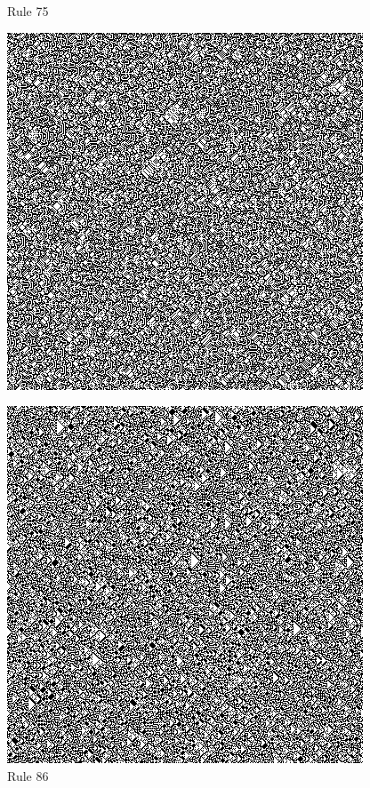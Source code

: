 \documentclass{article}
\begin{document}
\begin{figure}[H]
  \begin{center}
    \begin{minipage}{0.48\textwidth}
      \caption{Rule 75}
      \label{fig:figure4}
      \centering
      \includegraphics[scale=.5]{75.png}
    \end{minipage}
    \begin{minipage}{0.48\textwidth}
      \caption{Rule 86}
      \label{fig:figure5}
      \centering
      \includegraphics[scale=.5]{86.png}
    \end{minipage}
    \begin{minipage}{0.48\textwidth}

\end{minipage}
\end{center}
\end{figure}
\end{document}
